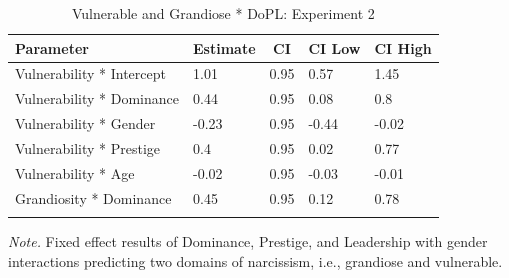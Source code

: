 \documentclass[
  donotrepeattitle,doc, 12pt, a4paper,floatsintext]{apa7}
\begin{document}
\begin{table}[ht]

\begin{center}
\begin{threeparttable}

\caption{\label{tab:pni-multi-dopl-int-exp-2}Vulnerable and Grandiose * DoPL: Experiment 2}

\begin{tabular}{lllll}
\toprule
Parameter & \multicolumn{1}{c}{Estimate} & \multicolumn{1}{c}{CI} & \multicolumn{1}{c}{CI Low} & \multicolumn{1}{c}{CI High}\\
\midrule
Vulnerability * Intercept & 1.01 & 0.95 & 0.57 & 1.45\\
Vulnerability * Dominance & 0.44 & 0.95 & 0.08 & 0.8\\
Vulnerability * Gender & -0.23 & 0.95 & -0.44 & -0.02\\
Vulnerability * Prestige & 0.4 & 0.95 & 0.02 & 0.77\\
Vulnerability * Age & -0.02 & 0.95 & -0.03 & -0.01\\
Grandiosity * Dominance & 0.45 & 0.95 & 0.12 & 0.78\\
\bottomrule
\addlinespace
\end{tabular}

\begin{tablenotes}[para]
\normalsize{\textit{Note.} Fixed effect results of Dominance, Prestige, and Leadership with gender interactions predicting two domains of narcissism, i.e., grandiose and vulnerable.}
\end{tablenotes}

\end{threeparttable}
\end{center}

\end{table}
\end{document}
